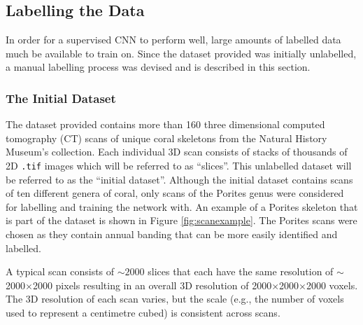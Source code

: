 \subsection{Labelling the Data}
\label{sec:2dlabel}

In order for a supervised CNN to perform well, large amounts of labelled data much be available to train on. Since the dataset provided was initially unlabelled, a manual labelling process was devised and is described in this section.

\subsubsection{The Initial Dataset}

The dataset provided contains more than 160 three dimensional computed tomography (CT) scans of unique coral skeletons from the Natural History Museum's collection. Each individual 3D scan consists of stacks of thousands of 2D \texttt{.tif} images which will be referred to as ``slices''. This unlabelled dataset will be referred to as the ``initial dataset''. Although the initial dataset contains scans of ten different genera of coral, only scans of the Porites genus were considered for labelling and training the network with. An example of a Porites skeleton that is part of the dataset is shown in Figure \ref{fig:scanexample}. The Porites scans were chosen as they contain annual banding that can be more easily identified and labelled.

A typical scan consists of ${\sim}2000$ slices that each have the same resolution of ${\sim}$2000$\times$2000 pixels resulting in an overall 3D resolution of 2000$\times$2000$\times$2000 voxels. The 3D resolution of each scan varies, but the scale (e.g., the number of voxels used to represent a centimetre cubed) is consistent across scans.

